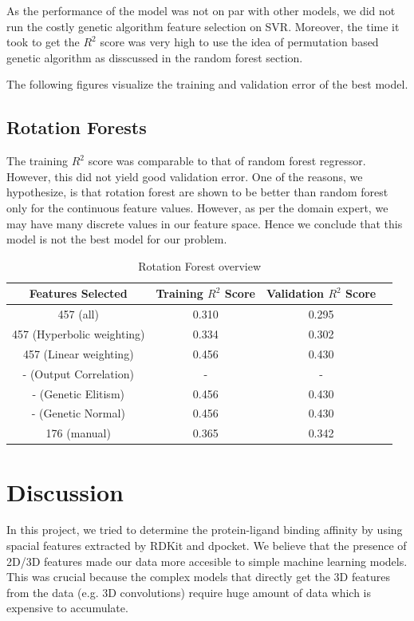 \documentclass[11pt]{article}
\begin{document}
As the performance of the model was not on par with other models,
we did not run the costly genetic algorithm feature selection on SVR.
Moreover,  the time it took to get the $R^2$ score was very high to use the idea of permutation based genetic algorithm as disscussed in the random forest section.

The following figures visualize the training and validation error of the best model.

\subsection{Rotation Forests}

The training $R^2$ score was comparable to that of random forest regressor.
However, this did not yield good validation error.
One of the reasons,  we hypothesize,  is that rotation forest are shown to be better than random forest only for the continuous feature values.
However,  as per the domain expert,  we may have many discrete values in our feature space.
Hence we conclude that this model is not the best model for our problem.

\begin{table} [h!]
\centering
 \begin{tabular}{ | c | c | c | c | }
\hline
\textbf{Features Selected} & \textbf{Training $R^2$ Score} & \textbf{Validation $R^2$ Score} \\ [0.5 ex]
\hline \hline
457 (all) & 0.310 & 0.295\\
457 (Hyperbolic weighting) & 0.334 & 0.302\\
457 (Linear weighting) & 0.456 & 0.430 \\
- (Output Correlation)\footnotemark[1] & - & -  \\ 
- (Genetic Elitism) & 0.456 & 0.430 \\
- (Genetic Normal) & 0.456 & 0.430 \\
176 (manual) & 0.365  & 0.342  \\ [1ex]
\hline
\end{tabular}
\caption{Rotation Forest overview}
\label {table:4}
\end{table}

\section{Discussion}
In this project,  we tried to determine the protein-ligand binding affinity by using spacial features extracted by RDKit and dpocket.
We believe that the presence of 2D/3D features made our data more accesible to simple machine learning models. 
This was crucial because the complex models that directly get the 3D features from the data (e.g. 3D convolutions) require huge amount of data which is expensive to accumulate.
\end{document}
